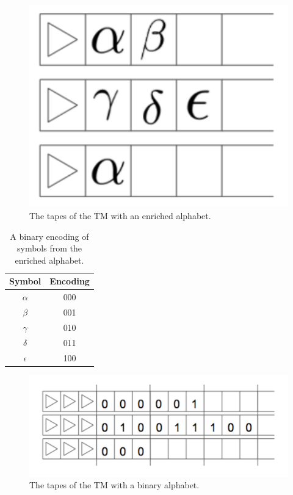 \documentclass[usletter]{article}
\begin{document}
\begin{figure}[h!]
\begin{center}
\includegraphics[width=.3\textwidth]{enriched}
\end{center}
\caption{The tapes of the TM with an enriched alphabet.}
\label{fig:enriched}
\end{figure}

\begin{table}[h!]
\begin{center}
\begin{tabular}{c | c}
\textbf{Symbol} & \textbf{Encoding}\\\hline
$\alpha$ & 000\\
$\beta$ & 001\\
$\gamma$ & 010\\
$\delta$ & 011\\
$\epsilon$ & 100\\
\end{tabular}
\end{center}
\caption{A binary encoding of symbols from the enriched alphabet.}
\label{table:encoding}
\end{table}

\begin{figure}[h!]
\begin{center}
\includegraphics[width=.6\textwidth]{encoded}
\end{center}
\caption{The tapes of the TM with a binary alphabet.}
\label{fig:encoded}
\end{figure}
\end{document}
